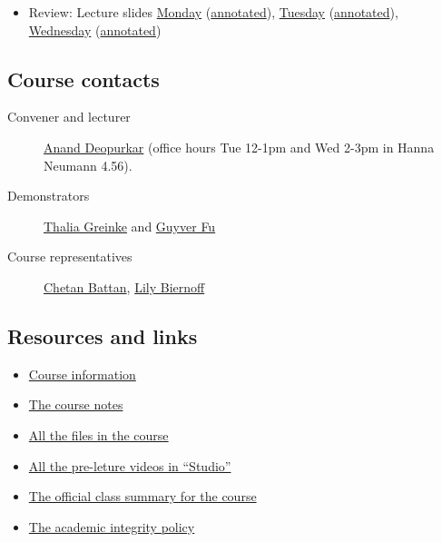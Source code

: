 \documentclass{amsart}
\begin{document}
\begin{itemize}
\begin{itemize}
\item Review: Lecture slides \href{https://canvas.anu.edu.au/files/1234714/download?download\_frd=1\&verifier=jkRkqQknmEyL2PEkgXFH3FXbR981pCerSasaBB94}{Monday} (\href{https://canvas.anu.edu.au/files/1240324/download?download\_frd=1\&verifier=wraKuB4iCL6vwLq6WtcowhwZw8vui7CBnVAXqoQk}{annotated}), \href{https://canvas.anu.edu.au/files/1238150/download?download\_frd=1\&verifier=2jOaZTXS7trxziz9VeKxNJZodWXOsxp3Esbip4C1}{Tuesday} (\href{https://canvas.anu.edu.au/files/1240323/download?download\_frd=1\&verifier=KAiWED3lVHMkcLDN4z2XmbSQmnbAucrKA4N8Szll}{annotated}), \href{https://canvas.anu.edu.au/files/1240321/download?download\_frd=1\&verifier=q88GGCxbn2R29Z1TMh6T9mJWD3yDHZTqduojZT8t}{Wednesday} (\href{https://canvas.anu.edu.au/files/1249504/download?download\_frd=1\&verifier=G0cdK4KdzposoO0NfVnO0tj1B3ndPRWAVq5ZUrjX}{annotated})
\end{itemize}
\end{itemize}
\subsection{Course contacts}
\label{sec:org9ad3f25}
\begin{description}
\item[{Convener and lecturer}] \href{mailto:anand.deopurkar@anu.edu.au}{Anand Deopurkar} (office hours Tue 12-1pm and Wed 2-3pm in Hanna Neumann 4.56).

\item[{Demonstrators}] \href{mailto:Thalia.Greinke@anu.edu.au}{Thalia Greinke} and \href{mailto:Guyver.Fu@anu.edu.au}{Guyver Fu}

\item[{Course representatives}] \href{mailto:u7798996@anu.edu.au}{Chetan Battan}, \href{mailto:u7918206@anu.edu.au}{Lily Biernoff}
\end{description}
\subsection*{Resources and links}
\label{sec:org170f2ac}
\begin{itemize}
\item \href{https://canvas.anu.edu.au/courses/2640/pages/course-information}{Course information}
\item \href{https://canvas.anu.edu.au/files/715877/}{The course notes}
\item \href{https://canvas.anu.edu.au/courses/2640/files}{All the files in the course}
\item \href{https://canvas.anu.edu.au/courses/2640/external\_tools/207}{All the pre-leture videos in ``Studio''}
\item \href{https://programsandcourses.anu.edu.au/course/MATH2301/Second\%20Semester/8564}{The official class summary for the course}
\item \href{https://canvas.anu.edu.au/courses/2640/pages/academic-integrity-policy-for-assignments}{The academic integrity policy}
\end{itemize}
\end{document}
